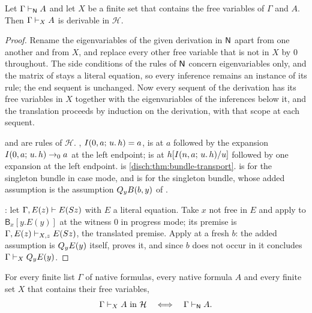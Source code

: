 \begin{lemma}
\label{disch:lem:bundle-embed}
Let $\Gamma\vdash_{\mathsf{N}}A$ and let $X$ be a finite set that contains the
free variables of $\Gamma$ and $A$. Then $\Gamma\vdash_XA$ is derivable in
$\mathcal H$.
\end{lemma}

\begin{proof}
Rename the eigenvariables of the given derivation in $\mathsf{N}$ apart from one
another and from $X$, and replace every other free variable that is not in
$X$ by $0$ throughout. The side conditions of the rules of $\mathsf{N}$ concern
eigenvariables only, and the matrix of  stays a literal
equation, so every inference remains an instance of its rule; the end
sequent is unchanged. Now every sequent of the derivation has its free
variables in $X$ together with the eigenvariables of the inferences below
it, and the translation proceeds by induction on the derivation, with that
scope at each sequent.

 and  are rules of $\mathcal H$. ,
$I(0,a;\,u.\,h)=a$, is  at $a$ followed by the expansion
$I(0,a;\,u.\,h)\to_0a$ at the left endpoint;  is
 at $h[I(n,a;\,u.\,h)/u]$ followed by one expansion
at the left endpoint.  is
\cref{disch:thm:bundle-transport}.  is  for the
singleton bundle in case mode, and  is  for the
singleton bundle, whose added assumption is the assumption $Q_{y}B(b,y)$ of
.

: let $\Gamma,E(z)\vdash E(S z)$ with $E$ a literal
equation. Take $x$ not free in $E$ and apply  to
$\mathsf B_x[y.E(y)]$ at the witness $0$ in progress mode; its premise is
$\Gamma,E(z)\vdash_{X,z}E(S z)$, the translated premise. Apply
 at a fresh $b$: the added assumption is $Q_{y}E(y)$ itself,
 proves it, and since $b$ does not occur in it 
concludes $\Gamma\vdash_XQ_{y}E(y)$.
\end{proof}

\begin{theorem}
\label{disch:thm:bundle}
For every finite list $\Gamma$ of native formulas, every native formula $A$
and every finite set $X$ that contains their free variables,
\[
 \Gamma\vdash_XA\ \text{in}\ \mathcal H
 \quad\Longleftrightarrow\quad
 \Gamma\vdash_{\mathsf{N}}A .
\]
\end{theorem}

